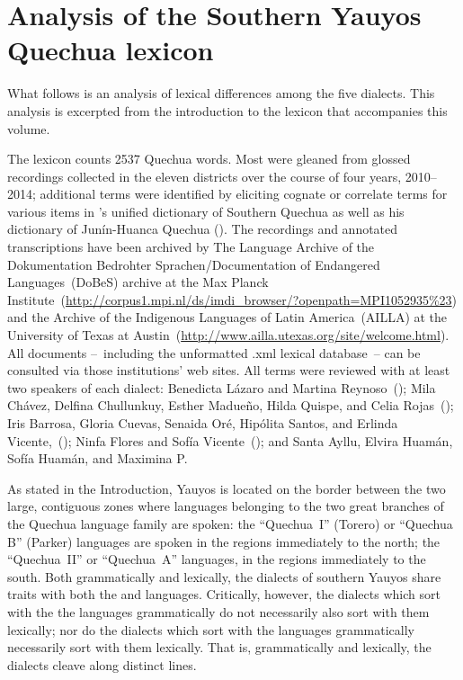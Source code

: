 \chapter{Analysis of the Southern Yauyos Quechua lexicon}

What follows is an analysis of lexical differences among the five dialects. This analysis is excerpted from the introduction to the lexicon that accompanies this volume.

The lexicon counts 2537 Quechua words. Most were gleaned from glossed recordings collected in the eleven districts over the course of four years, 2010--2014; additional terms were identified by eliciting cognate or correlate terms for various items in \citet{CerroP94}'s unified dictionary of Southern Quechua as well as his dictionary of Junín-Huanca Quechua (\citet{CerroP76b}). The recordings and annotated transcriptions have been archived by The Language Archive of the Dokumentation Bedrohter Sprachen/Documentation of Endangered Languages~(DoBeS) archive at the Max Planck Institute~(\url{http://corpus1.mpi.nl/ds/imdi_browser/?openpath=MPI1052935\%23}) and the Archive of the Indigenous Languages of Latin America~(AILLA) at the University of Texas at Austin~(\url{http://www.ailla.utexas.org/site/welcome.html}). All documents --~including the unformatted \mbox{.xml} lexical database~-- can be consulted via those institutions’ web sites. All terms were reviewed with at least two speakers of each dialect: Benedicta Lázaro and Martina Reynoso~(\AH); Mila Chávez, Delfina Chullunkuy, Esther Madueño, Hilda Quispe, and Celia Rojas~(\MV); Iris Barrosa, Gloria Cuevas, Senaida Oré, Hipólita Santos, and Erlinda Vicente,~(\CH); Ninfa Flores and Sofía Vicente~(\LT); and Santa Ayllu, Elvira Huamán, Sofía Huamán, and Maximina P. 

As stated in the Introduction, Yauyos is located on the border between the two large, contiguous zones where languages belonging to the two great branches of the Quechua language family are spoken: the “Quechua~I” (Torero) or “Quechua B” (Parker) languages are spoken in the regions immediately to the north; the “Quechua~II” or “Quechua~A” languages, in the regions immediately to the south. Both grammatically and lexically, the dialects of southern Yauyos share traits with both the \QI{} and \QII{} languages. Critically, however, the dialects which sort with the the \QI{} languages grammatically do not necessarily also sort with them lexically; nor do the dialects which sort with the \QII{} languages grammatically necessarily sort with them lexically. That is, grammatically and lexically, the dialects cleave along distinct lines.

